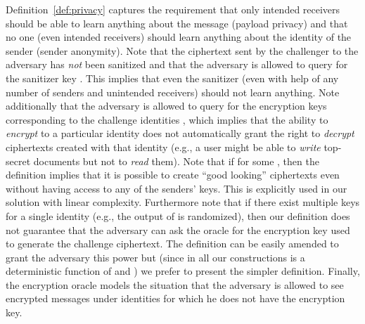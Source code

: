 \documentclass{llncs}
\begin{document}
Definition~\ref{def:privacy} captures the requirement that only intended receivers should be able to learn anything about the message (payload privacy) and that no one (even intended receivers) should learn anything about the identity of the sender (sender anonymity). Note that the ciphertext  sent by the challenger to the adversary has \emph{not} been sanitized and that the adversary is allowed to query for the sanitizer key . This implies that even the sanitizer (even with help of any number of senders and unintended receivers) should not learn anything. Note additionally that the adversary is allowed to query for the encryption keys  corresponding to the challenge identities , which implies that the ability to \emph{encrypt} to a particular identity does not automatically grant the right to \emph{decrypt} ciphertexts created with that identity (e.g., a user might be able to \emph{write} top-secret documents but not to \emph{read} them). Note that if  for some , then the definition implies that it is possible to create ``good looking'' ciphertexts even without having access to any of the senders' keys. This is  explicitly used in our solution with linear complexity. 
Furthermore note that if there exist multiple keys for a single identity (e.g., the output of  is randomized), then our definition does not guarantee that the adversary can ask the oracle  for the encryption key used to generate the challenge ciphertext. The definition can be easily amended to grant the adversary this power but (since in all our constructions  is a deterministic function of  and ) we prefer to present the simpler definition.
Finally, the encryption oracle  models the situation that the adversary is allowed to see encrypted messages under identities for which he does not have the encryption key.
\end{document}

